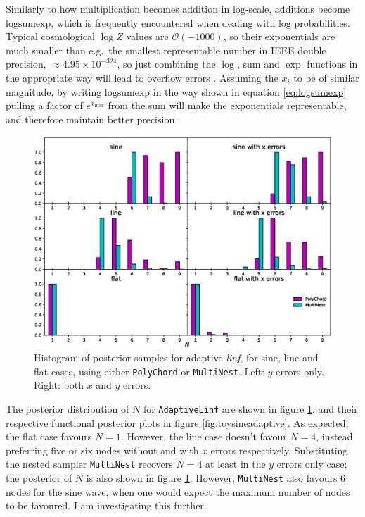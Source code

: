 \documentclass{article}
\begin{document}
Similarly to how multiplication becomes addition in log-scale, additions become $\textrm{logsumexp}$, which is frequently encountered when dealing with log probabilities. Typical cosmological $\log Z$ values are $\mathcal{O}\left(-1000\right)$, so their exponentials are much smaller than e.g.\ the smallest representable number in IEEE double precision, $\approx4.95\times10^{-324}$, so just combining the $\log$, $\textrm{sum}$ and $\exp$ functions in the appropriate way will lead to overflow errors \cite{IEEE}. Assuming the $x_i$ to be of similar magnitude, by writing $\textrm{logsumexp}$ in the way shown in equation \ref{eq:logsumexp} pulling a factor of $e^{x_\textrm{max}}$ from the sum will make the exponentials representable, and therefore maintain better precision \cite{logsumexp}.

\begin{figure}[!hb]
  \centering
  \includegraphics[width=14cm]{toysineN.eps}
  \caption{Histogram of posterior samples for adaptive \textit{linf}, for sine, line and flat cases, using either \texttt{PolyChord} or \texttt{MultiNest}. Left: $y$ errors only. Right: both $x$ and $y$ errors.}
  \label{fig:toysineN}
\end{figure}

The posterior distribution of $N$ for \texttt{AdaptiveLinf} are shown in figure \ref{fig:toysineN}, and their respective functional posterior plots in figure \ref{fig:toysineadaptive}. As expected, the flat case favours $N=1$. However, the line case doesn't favour $N=4$, instead preferring five or six nodes without and with $x$ errors respectively. Substituting the nested sampler \texttt{MultiNest} recovers $N=4$ at least in the $y$ errors only case; the posterior of $N$ is also shown in figure \ref{fig:toysineN}. However, \texttt{MultiNest} also favours 6 nodes for the sine wave, when one would expect the maximum number of nodes to be favoured. I am investigating this further. 
\end{document}
